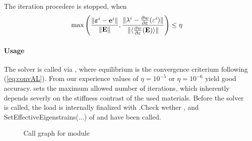 The iteration procedere is stopped, when
\begin{equation}
 \max \left(\frac{\| \varepsilonB^i - \eB^i\|}{\|\EB\|}, \frac{\|\lambda^i-\frac{\partial w}{\partial \varepsilon}(\varepsilon^i)\|}{\|\langle \frac{\partial w}{\partial \varepsilon}(\EB)\rangle\|} \right) \leq \eta
\label{eq:convAL}
\end{equation}

\paragraph{Usage} The solver is called via , where \textsf{equilibrium} is the convergence criterium following (\ref{eq:convAL}). From our experience values of $\eta = 10^{-5}$ or $\eta = 10^{-6}$ yield good accuracy.  sets the maximum allowed number of iterations, which inherently depends severly on the stiffness contrast of the used materials. Before the solver is called, the load is internally finalized with .Check wether  ,  and \textsf{ SetEffectiveEigenstrains(...)} of  and  have been called.
                     
            
\CallGraphSettings

\begin{figure}
\centering
{}
\caption{Call graph for module }
\end{figure}